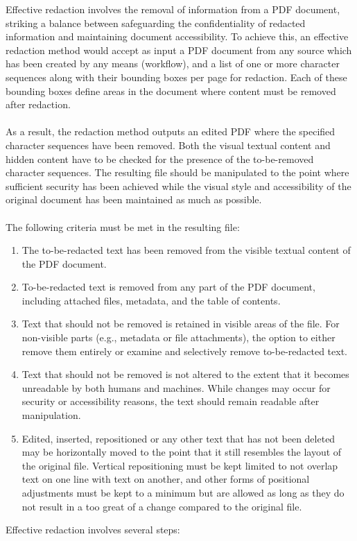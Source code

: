 Effective redaction involves the removal of information from a PDF document, striking a balance between safeguarding the confidentiality of redacted information and maintaining document accessibility. To achieve this, an effective redaction method would accept as input a PDF document from any source which has been created by any means (workflow), and a list of one or more character sequences along with their bounding boxes per page for redaction. Each of these bounding boxes define areas in the document where content must be removed after redaction.
\\\\
As a result, the redaction method outputs an edited PDF where the specified character sequences have been removed. Both the visual textual content and hidden content have to be checked for the presence of the to-be-removed character sequences. The resulting file should be manipulated to the point where sufficient security has been achieved while the visual style and accessibility of the original document has been maintained as much as possible. 
\\\\
The following criteria must be met in the resulting file:
\begin{enumerate}
    \item The to-be-redacted text has been removed from the visible textual content of the PDF document.
    \item To-be-redacted text is removed from any part of the PDF document, including attached files, metadata, and the table of contents.
    \item Text that should not be removed is retained in visible areas of the file. For non-visible parts (e.g., metadata or file attachments), the option to either remove them entirely or examine and selectively remove to-be-redacted text. 
    \item Text that should not be removed is not altered to the extent that it becomes unreadable by both humans and machines. While changes may occur for security or accessibility reasons, the text should remain readable after manipulation. 
    \item Edited, inserted, repositioned or any other text that has not been deleted may be horizontally moved to the point that it still resembles the layout of the original file. Vertical repositioning must be kept limited to not overlap text on one line with text on another, and other forms of positional adjustments must be kept to a minimum but are allowed as long as they do not result in a too great of a change compared to the original file.
\end{enumerate}
Effective redaction involves several steps:

